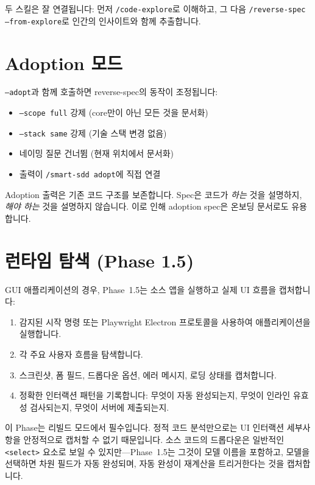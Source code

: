 \documentclass[11pt,a4paper,openright,twoside]{report}
\newcommand{\cmd}[1]{\texttt{/#1}}
\begin{document}
두 스킬은 잘 연결됩니다: 먼저 \cmd{code-explore}로 이해하고, 그 다음 \cmd{reverse-spec --from-explore}로 인간의 인사이트와 함께 추출합니다.

\section{Adoption 모드}

\texttt{--adopt}과 함께 호출하면 reverse-spec의 동작이 조정됩니다:

\begin{itemize}
  \item \texttt{--scope full} 강제 (core만이 아닌 모든 것을 문서화)
  \item \texttt{--stack same} 강제 (기술 스택 변경 없음)
  \item 네이밍 질문 건너뜀 (현재 위치에서 문서화)
  \item 출력이 \texttt{/smart-sdd adopt}에 직접 연결
\end{itemize}

Adoption 출력은 기존 코드 구조를 보존합니다. Spec은 코드가 \emph{하는} 것을 설명하지, \emph{해야 하는} 것을 설명하지 않습니다. 이로 인해 adoption spec은 온보딩 문서로도 유용합니다.

\section{런타임 탐색 (Phase 1.5)}

GUI 애플리케이션의 경우, Phase~1.5는 소스 앱을 실행하고 실제 UI 흐름을 캡처합니다:

\begin{enumerate}
  \item 감지된 시작 명령 또는 Playwright Electron 프로토콜을 사용하여 애플리케이션을 실행합니다.
  \item 각 주요 사용자 흐름을 탐색합니다.
  \item 스크린샷, 폼 필드, 드롭다운 옵션, 에러 메시지, 로딩 상태를 캡처합니다.
  \item 정확한 인터랙션 패턴을 기록합니다: 무엇이 자동 완성되는지, 무엇이 인라인 유효성 검사되는지, 무엇이 서버에 제출되는지.
\end{enumerate}

이 Phase는 리빌드 모드에서 필수입니다. 정적 코드 분석만으로는 UI 인터랙션 세부사항을 안정적으로 캡처할 수 없기 때문입니다. 소스 코드의 드롭다운은 일반적인 \texttt{<select>} 요소로 보일 수 있지만---Phase~1.5는 그것이 모델 이름을 포함하고, 모델을 선택하면 차원 필드가 자동 완성되며, 자동 완성이 재계산을 트리거한다는 것을 캡처합니다.
\end{document}
